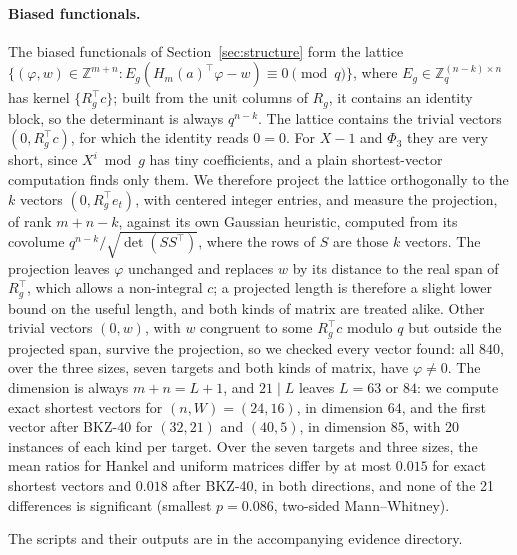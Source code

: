 \documentclass[11pt,a4paper]{article}
\theoremstyle{definition}
\newcommand{\Z}{\mathbb{Z}}
\newcommand{\Zq}{\mathbb{Z}_q}
\begin{document}
\paragraph{Biased functionals.} The biased functionals of Section~\ref{sec:structure} form the lattice $\{(\varphi, w) \in \Z^{m+n} : E_g(H_m(a)^{\top}\varphi - w) \equiv 0 \pmod q\}$, where $E_g \in \Zq^{(n-k) \times n}$ has kernel $\{R_g^{\top} c\}$; built from the unit columns of $R_g$, it contains an identity block, so the determinant is always $q^{n-k}$. The lattice contains the trivial vectors $(0, R_g^{\top} c)$, for which the identity reads $0 = 0$. For $X - 1$ and $\Phi_3$ they are very short, since $X^i \bmod g$ has tiny coefficients, and a plain shortest-vector computation finds only them. We therefore project the lattice orthogonally to the $k$ vectors $(0, R_g^{\top} e_t)$, with centered integer entries, and measure the projection, of rank $m + n - k$, against its own Gaussian heuristic, computed from its covolume $q^{n-k}/\sqrt{\det(S S^{\top})}$, where the rows of $S$ are those $k$ vectors. The projection leaves $\varphi$ unchanged and replaces $w$ by its distance to the real span of $R_g^{\top}$, which allows a non-integral $c$; a projected length is therefore a slight lower bound on the useful length, and both kinds of matrix are treated alike. Other trivial vectors $(0, w)$, with $w$ congruent to some $R_g^{\top} c$ modulo $q$ but outside the projected span, survive the projection, so we checked every vector found: all $840$, over the three sizes, seven targets and both kinds of matrix, have $\varphi \ne 0$. The dimension is always $m + n = L + 1$, and $21 \mid L$ leaves $L = 63$ or $84$: we compute exact shortest vectors for $(n, W) = (24, 16)$, in dimension $64$, and the first vector after BKZ-40 for $(32, 21)$ and $(40, 5)$, in dimension $85$, with 20 instances of each kind per target. Over the seven targets and three sizes, the mean ratios for Hankel and uniform matrices differ by at most $0.015$ for exact shortest vectors and $0.018$ after BKZ-40, in both directions, and none of the 21 differences is significant (smallest $p = 0.086$, two-sided Mann--Whitney).

The scripts and their outputs are in the accompanying evidence directory.

\end{document}
